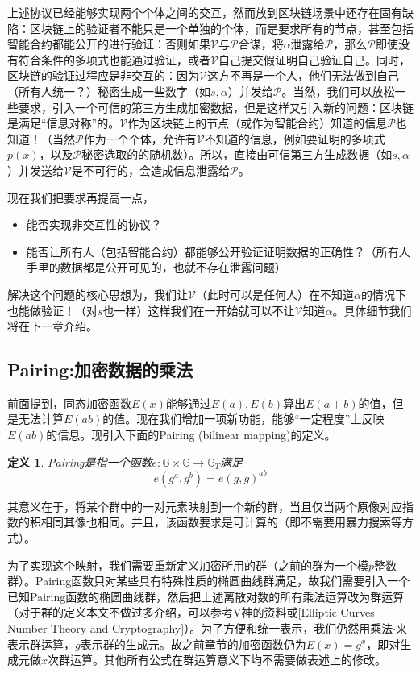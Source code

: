 \documentclass[12pt]{article}
\newcommand{\pp}{$\mathcal{P}$}
\newcommand{\vv}{$\mathcal{V}$}
\newtheorem{definition}{定义}
\begin{document}
上述协议已经能够实现两个个体之间的交互，然而放到区块链场景中还存在固有缺陷：区块链上的验证者不能只是一个单独的个体，而是要求所有的节点，甚至包括智能合约都能公开的进行验证：否则如果\vv 与\pp 合谋，将$\alpha$泄露给\pp，那么\pp 即使没有符合条件的多项式也能通过验证，或者\vv 自己提交假证明自己验证自己。同时，区块链的验证过程应是非交互的：因为\vv 这方不再是一个人，他们无法做到自己（所有人统一？）秘密生成一些数字（如$s,\alpha$）并发给\pp。当然，我们可以放松一些要求，引入一个可信的第三方生成加密数据，但是这样又引入新的问题：区块链是满足“信息对称”的。\vv 作为区块链上的节点（或作为智能合约）知道的信息\pp 也知道！（当然\pp 作为一个个体，允许有\vv 不知道的信息，例如要证明的多项式$p(x)$，以及\pp 秘密选取的的随机数）。所以，直接由可信第三方生成数据（如$s,\alpha$）并发送给\vv 是不可行的，会造成信息泄露给\pp。

现在我们把要求再提高一点，
\begin{itemize}
    \item 能否实现非交互性的协议？
    \item 能否让所有人（包括智能合约）都能够公开验证证明数据的正确性？（所有人手里的数据都是公开可见的，也就不存在泄露问题）
\end{itemize}
解决这个问题的核心思想为，我们让\vv （此时可以是任何人）在不知道$\alpha$的情况下也能做验证！（对$s$也一样）这样我们在一开始就可以不让\vv 知道$\alpha$。具体细节我们将在下一章介绍。
\subsection{Pairing:加密数据的乘法}
前面提到，同态加密函数$E(x)$能够通过$E(a),E(b)$算出$E(a+b)$的值，但是无法计算$E(ab)$的值。现在我们增加一项新功能，能够“一定程度”上反映$E(ab)$的信息。现引入下面的Pairing (bilinear mapping)的定义。
\begin{definition}
	Pairing是指一个函数$e: \mathbb{G}\times \mathbb{G} \rightarrow \mathbb{G}_T$满足
	$$e(g^a,g^b) = e(g,g)^{ab}$$
\end{definition}
其意义在于，将某个群中的一对元素映射到一个新的群，当且仅当两个原像对应指数的积相同其像也相同。并且，该函数要求是可计算的（即不需要用暴力搜索等方式）。

为了实现这个映射，我们需要重新定义加密所用的群（之前的群为一个模$p$整数群）。Pairing函数只对某些具有特殊性质的椭圆曲线群满足，故我们需要引入一个已知Pairing函数的椭圆曲线群，然后把上述离散对数的所有乘法运算改为群运算（对于群的定义本文不做过多介绍，可以参考V神的资料或[Elliptic Curves Number Theory and Cryptography]）。为了方便和统一表示，我们仍然用乘法$\cdot$来表示群运算，$g$表示群的生成元。故之前章节的加密函数仍为$E(x)=g^x$，即对生成元做$x$次群运算。其他所有公式在群运算意义下均不需要做表述上的修改。
\end{document}
